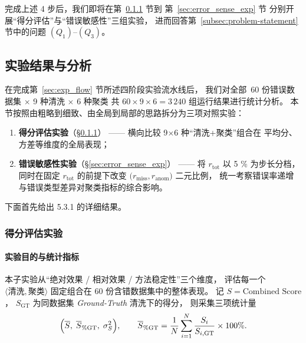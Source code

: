 \documentclass[10pt]{article} %
\numberwithin{equation}{section}
\begin{document}
\noindent
完成上述 4 步后，我们即将在第~\ref{sec:score_eval_exp} 节到
第~\ref{sec:error_sense_exp} 节
分别开展“得分评估”与“错误敏感性”三组实验，
进而回答第~\ref{subsec:problem-statement} 节中的问题 \((Q_1)–(Q_3)\)。

\subsection{实验结果与分析}
\label{sec:exp_results}

在完成第~\ref{sec:exp_flow} 节所述四阶段实验流水线后，
我们对全部 \(\,60\) 份错误数据集
\(\times\) 9 种清洗 \(\times\) 6 种聚类
共 \(60\times9\times6=3\,240\) 组运行结果进行统计分析。
本节按照由粗略到细致、由全局到局部的思路拆分为三项对照实验：

\begin{enumerate}[leftmargin=2.5em]
  \item \textbf{得分评估实验}（\S\ref{sec:score_eval_exp}）  
        —— 横向比较 9\(\times\)6 种“清洗+聚类”组合在
        平均分、方差等维度的全局表现；
  \item \textbf{错误敏感性实验}（\S\ref{sec:error_sense_exp}）  
        —— 将 \(r_{\text{tot}}\) 以 5 \% 为步长分档，  
        同时在固定 \(r_{\text{tot}}\) 的前提下改变
        \(\bigl(r_{\text{miss}},r_{\text{anom}}\bigr)\) 二元比例，  
        统一考察错误率递增与错误类型差异对聚类指标的综合影响。
\end{enumerate}

下面首先给出 5.3.1 的详细结果。

\subsubsection{得分评估实验}
\label{sec:score_eval_exp}

\paragraph{实验目的与统计指标}
本子实验从“绝对效果 / 相对效果 / 方法稳定性”三个维度，
评估每一个 \(\langle\!\text{清洗},\text{聚类}\!\rangle\) 固定组合在
60 份含错数据集中的整体表现。
记 \(S=\text{Combined Score}\)，
\(S_{\mathrm{GT}}\) 为同数据集 \textit{Ground-Truth} 清洗下的得分，
则采集三项统计量
\[
  \Bigl(
    \overline{S},\;
    \overline{S}_{\%\mathrm{GT}},\;
    \sigma^{2}_{S}
  \Bigr), \qquad
  \overline{S}_{\%\mathrm{GT}}
    =\frac{1}{N}\sum_{i=1}^{N}\frac{S_i}{S_{i,\mathrm{GT}}}\times100\%.
\]
\end{document}

